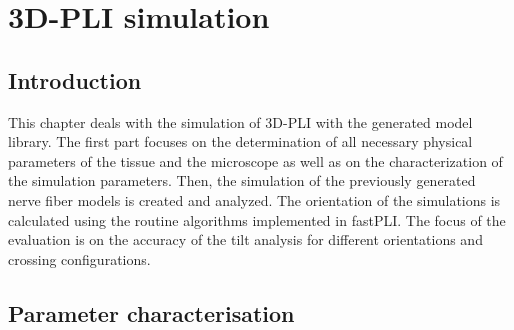 \cleardoublepage
\setcounter{chapter}{8}
\chapter{3D-PLI simulation}
\label{cha:simulation_analysis}
%
\section{Introduction}
%
This chapter deals with the simulation of \ac{3D-PLI} with the generated model library.
The first part focuses on the determination of all necessary physical parameters of the tissue and the microscope as well as on the characterization of the simulation parameters.
Then, the simulation of the previously generated nerve fiber models is created and analyzed.
The orientation of the simulations is calculated using the routine algorithms implemented in \ac{fastPLI}.
The focus of the evaluation is on the accuracy of the tilt analysis for different orientations and crossing configurations.
%
%
%
\section{Parameter characterisation}\label{sec:sim_choose_parameters}
%
